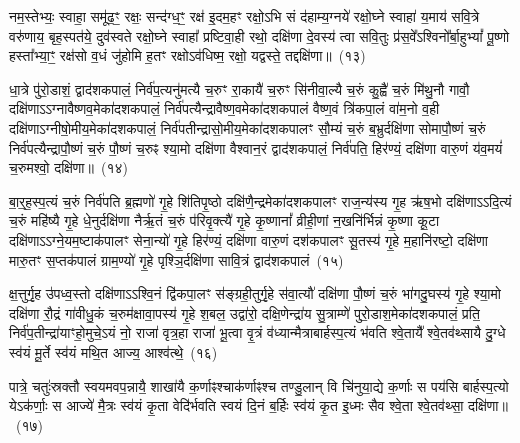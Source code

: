 नम॒स्तेभ्यः॒ स्वाहा॒ समू॑ढ॒ꣳ॒ रक्षः॒ सन्द॑ग्ध॒ꣳ॒ रक्ष॑ इ॒दम॒हꣳ रक्षो॒\-ऽभि सं द॑हाम्य॒ग्नये॑ रक्षो॒घ्ने स्वाहा॑ य॒माय॑ सवि॒त्रे वरु॑णाय॒ बृह॒स्पत॑ये॒ दुव॑स्वते रक्षो॒घ्ने स्वाहा᳚ प्रष्टिवा॒ही रथो॒ दक्षि॑णा दे॒वस्य॑ त्वा सवि॒तुः प्र॑स॒वे᳚\-ऽश्विनो᳚र्बा॒हु\-भ्यां᳚ पू॒ष्णो हस्ता᳚भ्या॒ꣳ॒ रक्ष॑सो व॒धं जु॑होमि ह॒तꣳ रक्षो\-ऽव॑धिष्म॒ रक्षो॒ यद्वस्ते॒ तद्दक्षि॑णा॥~(१३)


{\anuvakamend[{तेभ्यः॒ पञ्च॑चत्वारिꣳशच्च}]}%

धा॒त्रे पु॑रो॒डाशं॒ द्वाद॑श\-कपालं॒ निर्व॑प॒त्यनु॑मत्यै च॒रुꣳ रा॒कायै॑ च॒रुꣳ सि॑नीवा॒ल्यै च॒रुं कु॒ह्वै॑ च॒रुं मि॑थु॒नौ गावौ॒ दक्षि॑णा\-ऽ\-ऽग्नावैष्णव॒मेका॑\-दश\-कपालं॒ निर्व॑पत्यैन्द्रावैष्ण॒वमेका॑\-दश\-कपालं वैष्ण॒वं त्रि॑कपा॒लं वा॑म॒नो व॒ही दक्षि॑णा\-ऽग्नीषो॒मीय॒मेका॑\-दश\-कपालं॒ निर्व॑पतीन्द्रा\-सो॒मीय॒\-मेका॑\-दश\-कपालꣳ सौ॒म्यं च॒रुं ब॒भ्रुर्दक्षि॑णा सोमापौ॒ष्णं च॒रुं निर्व॑पत्यैन्द्रापौ॒ष्णं च॒रुं पौ॒ष्णं च॒रुꣴ श्या॒मो दक्षि॑णा वैश्वान॒रं द्वाद॑श\-कपालं॒ निर्व॑पति॒ हिर॑ण्यं॒ दक्षि॑णा वारु॒णं य॑व॒मयं॑ च॒रुमश्वो॒ दक्षि॑णा॥~(१४)

{\anuvakamend[{निर॒ष्टौ च}]}%

बा॒र्॒\mbox{}ह॒स्प॒त्यं च॒रुं निर्व॑पति ब्र॒ह्मणो॑ गृ॒हे शि॑तिपृ॒ष्ठो दक्षि॑णै॒न्द्रमेका॑\-दश\-कपालꣳ राज॒न्य॑स्य गृ॒ह ऋ॑ष॒भो दक्षि॑णा\-ऽ\-ऽदि॒त्यं च॒रुं महि॑ष्यै गृ॒हे धे॒नुर्दक्षि॑णा नैर्\mbox{}ऋ॒तं च॒रुं प॑रिवृ॒क्त्यै॑ गृ॒हे कृ॒ष्णानां᳚ व्रीही॒णां न॒खनि॑र्भिन्नं कृ॒ष्णा कू॒टा दक्षि॑णा\-ऽ\-ऽग्ने॒यम॒ष्टाक॑पालꣳ सेना॒न्यो॑ गृ॒हे हिर॑ण्यं॒ दक्षि॑णा वारु॒णं दश॑\-कपालꣳ सू॒तस्य॑ गृ॒हे म॒हानि॑रष्टो॒ दक्षि॑णा मारु॒तꣳ स॒प्तक॑पालं ग्राम॒ण्यो॑ गृ॒हे पृश्ञि॒र्दक्षि॑णा सावि॒त्रं द्वाद॑श\-कपालं~(१५)

क्ष॒त्तुर्गृ॒ह उ॑पध्व॒स्तो दक्षि॑णा\-ऽ\-ऽश्वि॒नं द्वि॑कपा॒लꣳ स॑ङ्ग्रही॒तुर्गृ॒हे स॑वा॒त्यौ॑ दक्षि॑णा पौ॒ष्णं च॒रुं भा॑गदु॒घस्य॑ गृ॒हे श्या॒मो दक्षि॑णा रौ॒द्रं गा॑वीधु॒कं च॒रुम॑क्षावा॒पस्य॑ गृ॒हे श॒बल॒ उद्वा॑रो॒ दक्षि॒णेन्द्रा॑य सु॒त्राम्णे॑ पुरो॒डाश॒मेका॑\-दश\-कपालं॒ प्रति॒ निर्व॑प॒तीन्द्रा॑याꣳहो॒मुचे॒\-ऽयं नो॒ राजा॑ वृत्र॒हा राजा॑ भू॒त्वा वृ॒त्रं व॑ध्यान्मैत्राबार्\mbox{}हस्प॒त्यं भ॑वति श्वे॒तायै᳚ श्वे॒तव॑थ्सायै दु॒ग्धे स्व॑यं मू॒र्ते स्व॑यं मथि॒त आज्य॒ आश्व॑त्थे॒~(१६)

पात्रे॒ चतुः॑स्रक्तौ स्वयमवप॒न्नायै॒ शाखा॑यै क॒र्णाꣴश्चा\-क॑र्णाꣴश्च तण्डु॒लान् वि चि॑नुया॒द्ये क॒र्णाः स पय॑सि बार्\mbox{}हस्प॒त्यो ये\-ऽक॑र्णाः॒ स आज्ये॑ मै॒त्रः स्व॑यं कृ॒ता वेदि॑र्भवति स्वयं दि॒नं ब॒र्\mbox{}हिः स्व॑यं कृ॒त इ॒ध्मः सैव श्वे॒ता श्वे॒तव॑थ्सा॒ दक्षि॑णा॥~(१७)


{\anuvakamend[{सा॒वि॒त्रं द्वाद॑श\-कपाल॒माश्व॑त्थे॒ त्रय॑स्त्रिꣳशच्च}]}%

